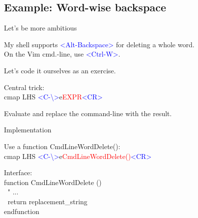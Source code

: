 \documentclass{beamer}
\newenvironment{mycode}[0]
{\ttfamily}
{}
\newcommand{\myind}[1]{\textcolor{white}{#1}}
\newcommand{\mycommt}[1]{\textcolor{comment}{#1}}
\newcommand{\mykeywd}[1]{\textcolor{keyword}{#1}}
\newcommand{\myctrlkey}[1]{\textcolor{blue}{#1}}
\begin{document}
\subsection{Example: Word-wise backspace}

\begin{frame}{Let's be more ambitious}{}
	
	My shell supports \myctrlkey{<Alt-Backspace>} for deleting a whole word. \\
	On the Vim cmd.-line, use \myctrlkey{<Ctrl-W>}. \\
	\vspace{2mm}

	Let's code it ourselves as an exercise. \\

	\vspace{5mm}
	\pause

	Central trick: \\
	\vspace{2mm}
	\begin{mycode}
		cmap  LHS  \myctrlkey{<C-\textbackslash>}e\textcolor{red}{EXPR}\myctrlkey{<CR>}
	\end{mycode}

	\vspace{2mm}
	Evaluate \code{\textcolor{red}{EXPR}} and replace the command-line with the result.

\end{frame}

\begin{frame}{Implementation}{}

	Use a function CmdLineWordDelete(): \\
	\vspace{2mm}
	\begin{mycode}
		cmap  LHS  \myctrlkey{<C-\textbackslash>}e\textcolor{red}{CmdLineWordDelete()}\myctrlkey{<CR>}
	\end{mycode}

	\vspace{5mm}

	Interface:\\
	\vspace{2mm}
	\begin{mycode}
		\mykeywd{function} CmdLineWordDelete () \\
		\myind{..}\mycommt{" ...} \\
		\myind{..}\mykeywd{return} replacement\_string \\
		\mykeywd{endfunction}
	\end{mycode}

\end{frame}
\end{document}
